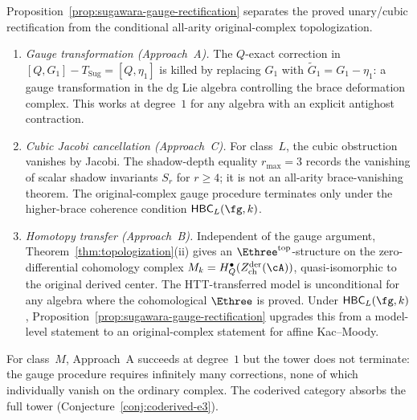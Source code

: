 \begin{remark}
\label{rem:three-approaches-chain-level}%
%
Proposition~\ref{prop:sugawara-gauge-rectification}
separates the proved unary/cubic rectification from the
conditional all-arity original-complex topologization.
\begin{enumerate}[label=\textup{(\alph*)}]
\item \emph{Gauge transformation
 \textup{(}Approach~A\textup{)}.}
 The $Q$-exact correction in
 $[Q, G_1] - T_{\mathrm{Sug}} = [Q, \eta_1]$
 is killed by replacing $G_1$ with
 $\widetilde G_1 = G_1 - \eta_1$:
 a gauge transformation in the dg Lie algebra controlling
 the brace deformation complex. This works at degree~$1$
 for any algebra with an explicit antighost contraction.
\item \emph{Cubic Jacobi cancellation
 \textup{(}Approach~C\textup{)}.}
 For class~$L$, the cubic obstruction vanishes by
 Jacobi. The shadow-depth equality $r_{\max}=3$ records
 the vanishing of scalar shadow invariants $S_r$ for
 $r\geq4$; it is not an all-arity brace-vanishing theorem.
 The original-complex gauge procedure terminates only under
 the higher-brace coherence condition
 $\mathsf{HBC}_L(\fg,k)$.
\item \emph{Homotopy transfer
 \textup{(}Approach~B\textup{)}.}
 Independent of the gauge argument,
 Theorem~\ref{thm:topologization}\textup{(ii)} gives
 an $\Ethree^{\mathrm{top}}$-structure on the
 zero-differential cohomology complex
 $M_k = H_Q^\bullet(Z^{\mathrm{der}}_{\mathrm{ch}}(\cA))$,
 quasi-isomorphic to the original derived center.
 The HTT-transferred model is unconditional for any
 algebra where the cohomological $\Ethree$ is proved.
 Under $\mathsf{HBC}_L(\fg,k)$,
 Proposition~\ref{prop:sugawara-gauge-rectification}
 upgrades this from a model-level statement to an
 original-complex statement for affine Kac--Moody.
\end{enumerate}
For class~$M$, Approach~A succeeds at degree~$1$ but the
tower does not terminate: the gauge procedure requires
infinitely many corrections, none of which individually
vanish on the ordinary complex. The coderived category
absorbs the full tower
\textup{(}Conjecture~\ref{conj:coderived-e3}\textup{)}.
\end{remark}

